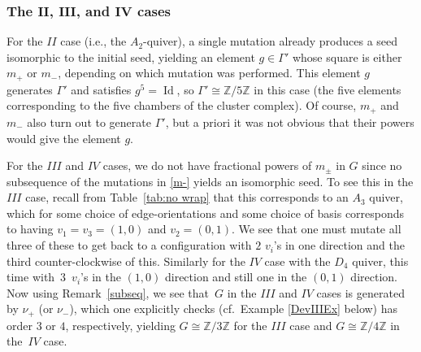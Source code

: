 \documentclass[pdftex]{sigma}
\numberwithin{equation}{section}
\numberwithin{figure}{section}
\numberwithin{table}{section}
\DeclareMathOperator{\id}{Id}
\let\bb=\mathbb
\theoremstyle{definition}
\begin{document}
\subsubsection[The $II$, $III$, and $IV$ cases]{The $\boldsymbol{II}$, $\boldsymbol{III}$, and $\boldsymbol{IV}$ cases} For the $II$ case (i.e., the $A_2$-quiver), a single mutation already produces a seed isomorphic to the initial seed, yielding an element $g\in \Gamma'$ whose square is either $m_+$ or $m_-$, depending on which mutation was performed. This element $g$ generates $\Gamma'$ and satisfies $g^5=\id$, so $\Gamma'\cong \bb{Z}/5\bb{Z}$ in this case (the five elements corresponding to the five chambers of the cluster complex). Of course, $m_+$ and $m_-$ also turn out to generate $\Gamma'$, but a priori it was not obvious that their powers would give the element $g$.

For the $III$ and $IV$ cases, we do not have fractional powers of $m_{\pm}$ in $G$ since no subsequence of the mutations in \eqref{m-} yields an isomorphic seed. To see this in the $III$ case, recall from Table~\ref{tab:no wrap} that this corresponds to an $A_3$ quiver, which for some choice of edge-orientations and some choice of basis corresponds to having $v_1=v_3=(1,0)$ and $v_2=(0,1)$. We see that one must mutate all three of these to get back to a configuration with $2$ $v_i$'s in one direction and the third counter-clockwise of this. Similarly for the $IV$ case with the $D_4$ quiver, this time with~$3$~$v_i$'s in the $(1,0)$ direction and still one in the $(0,1)$ direction. Now using Remark~\ref{subseq}, we see that~$G$ in the $III$ and $IV$ cases is generated by $\nu_+$ (or $\nu_-$), which one explicitly checks (cf.\ Example \ref{DevIIIEx} below) has order $3$ or $4$, respectively, yielding $G\cong \bb{Z}/3\bb{Z}$ for the $III$ case and $G\cong \bb{Z}/4\bb{Z}$ in the~$IV$ case.
\end{document}
